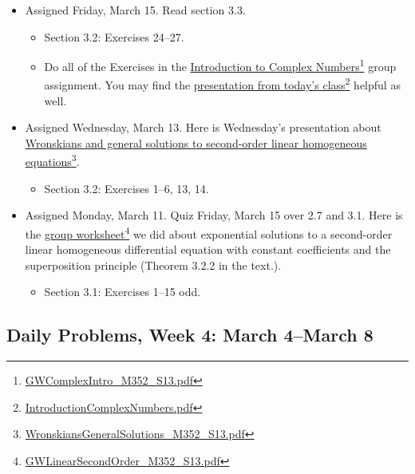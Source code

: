 \begin{itemize}
\item Assigned Friday, March 15. Read section 3.3.

\begin{itemize}
\item Section 3.2: Exercises 24--27.

\item Do all of the Exercises in the \href{GWComplexIntro_M352_S13.pdf}{Introduction to Complex Numbers}\footnote{\href{GWComplexIntro_M352_S13.pdf}{GWComplexIntro\_M352\_S13.pdf}} group assignment. You may find the \href{IntroductionComplexNumbers.pdf}{presentation from today's class}\footnote{\href{IntroductionComplexNumbers.pdf}{IntroductionComplexNumbers.pdf}} helpful as well.

\end{itemize}

\item Assigned Wednesday, March 13. Here is Wednesday's presentation about \href{WronskiansGeneralSolutions_M352_S13.pdf}{Wronskians and general solutions to second-order linear homogeneous equations}\footnote{\href{WronskiansGeneralSolutions_M352_S13.pdf}{WronskiansGeneralSolutions\_M352\_S13.pdf}}.

\begin{itemize}
\item Section 3.2: Exercises 1--6, 13, 14.

\end{itemize}

\item Assigned Monday, March 11. Quiz Friday, March 15 over 2.7 and 3.1. Here is the \href{GWLinearSecondOrder_M352_S13.pdf}{group worksheet}\footnote{\href{GWLinearSecondOrder_M352_S13.pdf}{GWLinearSecondOrder\_M352\_S13.pdf}} we did about exponential solutions to a second-order linear homogeneous differential equation with constant coefficients and the superposition principle (Theorem 3.2.2 in the text.).

\begin{itemize}
\item Section 3.1: Exercises 1--15 odd.

\end{itemize}

\end{itemize}

\subsection{Daily Problems, Week 4: March 4--March 8}
\label{dailyproblemsweek4:march4--march8}

